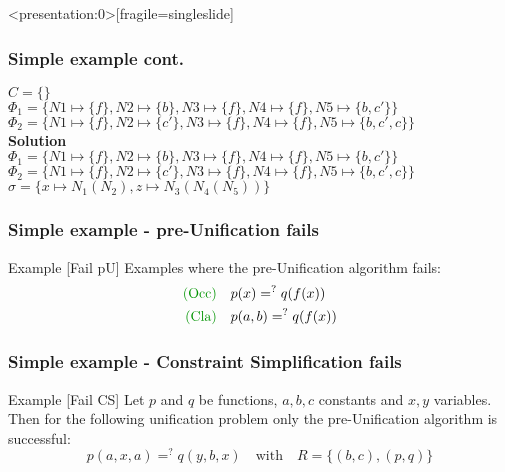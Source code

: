 		\begin{frame}<presentation:0>[fragile=singleslide]
	\frametitle{Simple example cont.}
	\(C=\{\}\)\\
	\(\Phi_1=\{N1\mapsto \{f\}, N2\mapsto \{b\}, N3\mapsto \{f\} , N4\mapsto \{f\},N5\mapsto \{b,c'\}\}\)\\
	\(\Phi_2=\{N1\mapsto \{f\}, N2\mapsto \{c'\}, N3\mapsto \{f\} , N4\mapsto \{f\},N5\mapsto \{b,c',c\}\}\)\\
	
	\vspace{0.5cm}
	\textbf{Solution}\\
	\(\Phi_1=\{N1\mapsto \{f\}, N2\mapsto \{b\}, N3\mapsto \{f\} , N4\mapsto \{f\},N5\mapsto \{b,c'\}\}\)\\
	\(\Phi_2=\{N1\mapsto \{f\}, N2\mapsto \{c'\}, N3\mapsto \{f\} , N4\mapsto \{f\},N5\mapsto \{b,c',c\}\}\)\\
	\(\sigma=\{x \mapsto N_1(N_2), z \mapsto N_3(N_4(N_5))\}\)\\
		\end{frame}
		
	\begin{frame}[fragile=singleslide]
	\frametitle{Simple example - pre-Unification fails}
	\begin{exampleblock}{Example [Fail pU] }
	Examples where the pre-Unification algorithm fails:
		\begin{gather}
		\begin{align}
				\text{\textcolor[rgb]{0,0.58,0}{(Occ)}}\quad & p(x) =^? q(f(x))\\
				\text{\textcolor[rgb]{0,0.58,0}{(Cla)}}\quad & p(a,b) =^? q(f(x))
		\end{align}
		\end{gather}
	\end{exampleblock}
		\vspace{0.5cm}
		\end{frame}
	
	\begin{frame}[fragile=singleslide]
	\frametitle{Simple example - Constraint Simplification fails}		
	\begin{exampleblock}{Example [Fail CS]}
	Let $p$ and $q$ be functions, $a,b,c$ constants and $x,y$ variables. Then for the following unification problem only the pre-Unification algorithm is successful:
	\[p(a,x,a) =^? q(y,b,x) \quad \text{with} \quad R=\{(b,c),(p,q)\}\]\\
	\end{exampleblock}
	\end{frame}
	

